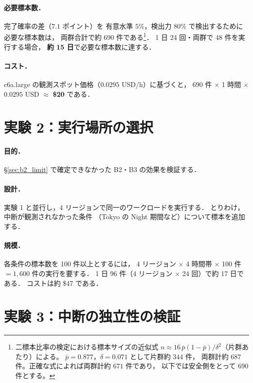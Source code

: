 \documentclass[11pt,a4paper]{ltjsreport}
\begin{document}
\paragraph{必要標本数．}
完了確率の差（$7.1$ ポイント）を
有意水準 $5\%$，検出力 $80\%$ で検出するために必要な標本数は，
両群合計で約 $690$ 件である\footnote{%
二標本比率の検定における標本サイズの近似式
$n \approx 16\,\bar p(1-\bar p)/\delta^{2}$（片群あたり）による。
$\bar p = 0.877$，$\delta = 0.071$ として片群約 $344$ 件，
両群計約 $687$ 件。正確な式によれば両群計約 $671$ 件であり，
以下では安全側をとって $690$ 件とする。}．
1 日 24 回・両群で 48 件を実行する場合，
\textbf{約 15 日}で必要な標本数に達する．

\paragraph{コスト．}
c6a.large の観測スポット価格（$0.0295$ USD/h）に基づくと，
$690$ 件 $\times$ 1 時間 $\times$ $0.0295$ USD
$\approx$ \textbf{\$20} である．

\section{実験 2：実行場所の選択}

\paragraph{目的．}
\S\ref{sec:b2_limit} で確定できなかった
B2・B3 の効果を検証する．

\paragraph{設計．}
実験 1 と並行し，4 リージョンで同一のワークロードを実行する．
とりわけ，中断が観測されなかった条件
（Tokyo の Night 期間など）について標本を追加する．

\paragraph{規模．}
各条件の標本数を 100 件以上とするには，
4 リージョン $\times$ 4 時間帯 $\times$ 100 件
$= 1{,}600$ 件の実行を要する．
1 日 96 件（4 リージョン $\times$ 24 回）で約 17 日である．
コストは約 \$47 である．

\section{実験 3：中断の独立性の検証}
\end{document}
